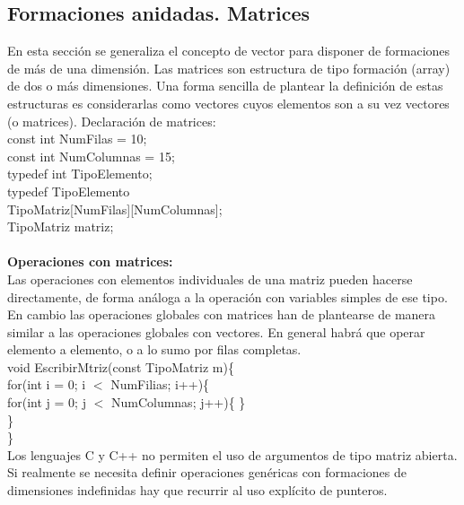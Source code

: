\documentclass[11pt,a4paper]{article}
\begin{document}
  \subsection{Formaciones anidadas. Matrices}
  En esta sección se generaliza el concepto de vector para disponer de formaciones de más de una dimensión.
  Las matrices son estructura de tipo formación (array) de dos o más dimensiones.
  Una forma sencilla de plantear la definición de estas estructuras es
  considerarlas como vectores cuyos elementos son a su vez vectores (o matrices). Declaración de matrices:\\
  const int NumFilas = 10;\\
  const int NumColumnas = 15;\\
  typedef int TipoElemento;\\
  typedef TipoElemento\\ TipoMatriz[NumFilas][NumColumnas];\\
  TipoMatriz matriz;\\
  \\
  \textbf{Operaciones con matrices:}\\
  Las operaciones con elementos individuales de una matriz pueden hacerse
  directamente, de forma análoga a la operación con variables simples de ese tipo.
  En cambio las operaciones globales con matrices han de plantearse de manera similar a las operaciones globales con vectores. En general habrá que operar elemento a elemento, o a lo sumo por filas completas.\\
  void EscribirMtriz(const TipoMatriz m)\{\\
  for(int i = 0; i $<$ NumFilias; i++)\{\\
  for(int j = 0; j $<$ NumColumnas; j++)\{ \} \\
   \} \\
   \}\\
   Los lenguajes C y C++ no permiten el uso de argumentos de tipo matriz abierta. Si realmente se necesita definir operaciones genéricas con formaciones de dimensiones indefinidas hay que recurrir al uso explícito de punteros.
\end{document}
